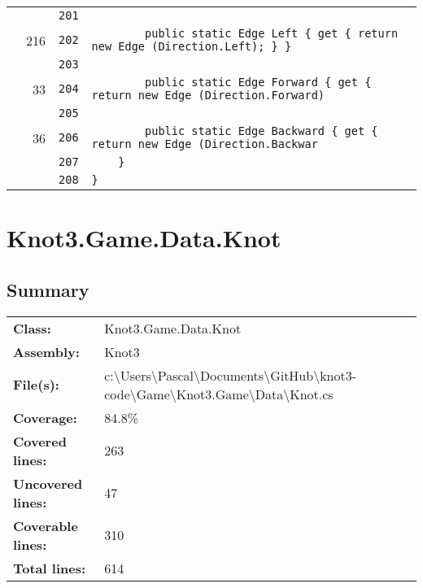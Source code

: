 \documentclass[a4paper,10pt]{article}
\begin{document}
\begin{longtable}[l]{lrrl}
\cellcolor{gray} &  & \verb~201~ & \verb~~\\
\cellcolor{green} & 216 & \verb~202~ & \verb~        public static Edge Left { get { return new Edge (Direction.Left); } }~\\
\cellcolor{gray} &  & \verb~203~ & \verb~~\\
\cellcolor{green} & 33 & \verb~204~ & \verb~        public static Edge Forward { get { return new Edge (Direction.Forward)~\\
\cellcolor{gray} &  & \verb~205~ & \verb~~\\
\cellcolor{green} & 36 & \verb~206~ & \verb~        public static Edge Backward { get { return new Edge (Direction.Backwar~\\
\cellcolor{gray} &  & \verb~207~ & \verb~    }~\\
\cellcolor{gray} &  & \verb~208~ & \verb~}~\\
\end{longtable}
\newpage
\section{Knot3.Game.Data.Knot}
\subsection{Summary}
\begin{longtable}[l]{ll}
\textbf{Class:} & Knot3.Game.Data.Knot\\
\textbf{Assembly:} & Knot3\\
\textbf{File(s):} & \begin{minipage}[t]{12cm}{c:\textbackslash Users\textbackslash Pascal\textbackslash Documents\textbackslash GitHub\textbackslash knot3-code\textbackslash Game\textbackslash Knot3.Game\textbackslash Data\textbackslash Knot.cs}\end{minipage} \\
\textbf{Coverage:} & 84.8\%\\
\textbf{Covered lines:} & 263\\
\textbf{Uncovered lines:} & 47\\
\textbf{Coverable lines:} & 310\\
\textbf{Total lines:} & 614\\
\end{longtable}
\end{document}
